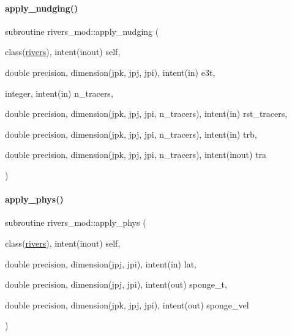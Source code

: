 \paragraph{\texorpdfstring{apply\+\_\+nudging()}{apply\_nudging()}}
{\footnotesize\ttfamily subroutine rivers\+\_\+mod\+::apply\+\_\+nudging (\begin{DoxyParamCaption}\item[{class(\mbox{\hyperlink{structrivers__mod_1_1rivers}{rivers}}), intent(inout)}]{self,  }\item[{double precision, dimension(jpk, jpj, jpi), intent(in)}]{e3t,  }\item[{integer, intent(in)}]{n\+\_\+tracers,  }\item[{double precision, dimension(jpk, jpj, jpi, n\+\_\+tracers), intent(in)}]{rst\+\_\+tracers,  }\item[{double precision, dimension(jpk, jpj, jpi, n\+\_\+tracers), intent(in)}]{trb,  }\item[{double precision, dimension(jpk, jpj, jpi, n\+\_\+tracers), intent(inout)}]{tra }\end{DoxyParamCaption})}

\mbox{\label{namespacerivers__mod_ae617fb601ff0091298f2bfff4dfbae40}} 
\paragraph{\texorpdfstring{apply\+\_\+phys()}{apply\_phys()}}
{\footnotesize\ttfamily subroutine rivers\+\_\+mod\+::apply\+\_\+phys (\begin{DoxyParamCaption}\item[{class(\mbox{\hyperlink{structrivers__mod_1_1rivers}{rivers}}), intent(inout)}]{self,  }\item[{double precision, dimension(jpj, jpi), intent(in)}]{lat,  }\item[{double precision, dimension(jpj, jpi), intent(out)}]{sponge\+\_\+t,  }\item[{double precision, dimension(jpk, jpj, jpi), intent(out)}]{sponge\+\_\+vel }\end{DoxyParamCaption})}

\mbox{\label{namespacerivers__mod_a057ffe419cdf846afa3ce68cbdf8568d}} 
